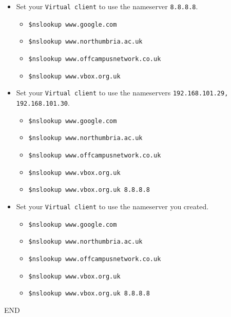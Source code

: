 \documentclass[11pt]{article}
\begin{document}
\begin{enumerate}
\begin{tcolorbox}[colback=blue!20]
\begin{itemize}
            \end{itemize}
        \end{tcolorbox}
        \begin{itemize}
            \item Set your \texttt{Virtual client} to use the nameserver \texttt{8.8.8.8}.
                \begin{itemize}
                    \item \texttt{\$nslookup www.google.com}
                    \item \texttt{\$nslookup www.northumbria.ac.uk}
                    \item \texttt{\$nslookup www.offcampusnetwork.co.uk}
                    \item \texttt{\$nslookup www.vbox.org.uk}
                \end{itemize} 
            \item Set your \texttt{Virtual client} to use the nameservers \texttt{192.168.101.29, 192.168.101.30}.
                \begin{itemize}
                    \item \texttt{\$nslookup www.google.com}
                    \item \texttt{\$nslookup www.northumbria.ac.uk}
                    \item \texttt{\$nslookup www.offcampusnetwork.co.uk}
                    \item \texttt{\$nslookup www.vbox.org.uk}
                    \item \texttt{\$nslookup www.vbox.org.uk 8.8.8.8}
                \end{itemize} 
            \item Set your \texttt{Virtual client} to use the nameserver you created.
                \begin{itemize}
                    \item \texttt{\$nslookup www.google.com}
                    \item \texttt{\$nslookup www.northumbria.ac.uk}
                    \item \texttt{\$nslookup www.offcampusnetwork.co.uk}
                    \item \texttt{\$nslookup www.vbox.org.uk}
                    \item \texttt{\$nslookup www.vbox.org.uk 8.8.8.8}
                \end{itemize} 
        \end{itemize}
    \end{enumerate}
END    
\end{document}
